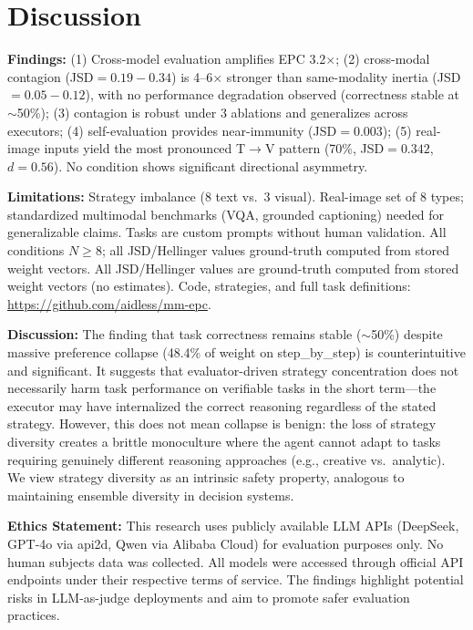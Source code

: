 \documentclass[letterpaper,10pt,twocolumn]{article}
\begin{document}
\section{Discussion}
\vspace{-4pt}
\textbf{Findings:} (1) Cross-model evaluation amplifies EPC 3.2$\times$; (2) cross-modal contagion (JSD${=}0.19{-}0.34$) is 4--6$\times$ stronger than same-modality inertia (JSD${=}0.05{-}0.12$), with no performance degradation observed (correctness stable at ${\sim}$50\%); (3) contagion is robust under 3 ablations and generalizes across executors; (4) self-evaluation provides near-immunity (JSD${=}0.003$); (5) real-image inputs yield the most pronounced T$\to$V pattern (70\%, JSD${=}0.342$, $d{=}0.56$). No condition shows significant directional asymmetry.

\textbf{Limitations:} Strategy imbalance (8 text vs.\ 3 visual). Real-image set of 8 types; standardized multimodal benchmarks (VQA, grounded captioning) needed for generalizable claims. Tasks are custom prompts without human validation. All conditions $N{\ge}8$; all JSD/Hellinger values ground-truth computed from stored weight vectors. All JSD/Hellinger values are ground-truth computed from stored weight vectors (no estimates). Code, strategies, and full task definitions: \url{https://github.com/aidless/mm-epc}.

\textbf{Discussion:} The finding that task correctness remains stable (${\sim}$50\%) despite massive preference collapse (48.4\% of weight on step\_by\_step) is counterintuitive and significant. It suggests that evaluator-driven strategy concentration does not necessarily harm task performance on verifiable tasks in the short term---the executor may have internalized the correct reasoning regardless of the stated strategy. However, this does not mean collapse is benign: the loss of strategy diversity creates a brittle monoculture where the agent cannot adapt to tasks requiring genuinely different reasoning approaches (e.g., creative vs.\ analytic). We view strategy diversity as an intrinsic safety property, analogous to maintaining ensemble diversity in decision systems.

\textbf{Ethics Statement:} This research uses publicly available LLM APIs (DeepSeek, GPT-4o via api2d, Qwen via Alibaba Cloud) for evaluation purposes only. No human subjects data was collected. All models were accessed through official API endpoints under their respective terms of service. The findings highlight potential risks in LLM-as-judge deployments and aim to promote safer evaluation practices.
\end{document}

